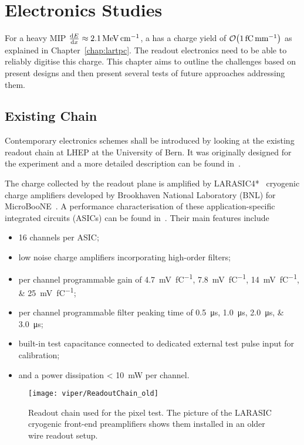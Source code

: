 \chapter{Electronics Studies}
\label{chap:electronics}

For a heavy MIP $\dv{E}{x} \approx \SI{2.1}{\mega\electronvolt\per\centi\metre}$, a \lartpc{} has a charge yield of $\order{\SI{1}{\femto\coulomb\per\milli\metre}}$ as explained in Chapter~\ref{chap:lartpc}.
The readout electronics need to be able to reliably digitise this charge.
This chapter aims to outline the challenges based on present designs and then present several tests of future approaches addressing them.

\section{Existing Chain}
\label{sec:electronics_existing}
Contemporary electronics schemes shall be introduced by looking at the existing readout chain at LHEP at the University of Bern.
It was originally designed for the \AT{} experiment and a more detailed description can be found in~\cite{AT_larasic}.

The charge collected by the readout plane is amplified by LARASIC4*~\cite{larasic} cryogenic charge amplifiers developed by Brookhaven National Laboratory (BNL) for MicroBooNE~\cite{uboone}.
A performance characterisation of these application-specific integrated circuits (ASICs) can be found in~\cite{AT_larasic}.
Their main features include

\begin{itemize}
	\item \num{16} channels per ASIC;
	\item low noise charge amplifiers incorporating high-order filters;
	\item per channel programmable gain of \SIlist[list-final-separator = { or }]{4.7; 7.8; 14; 25}{\milli\volt\per\femto\coulomb};
	\item per channel programmable filter peaking time of \SIlist[list-final-separator = { or }]{0.5; 1.0; 2.0; 3.0}{\micro\second};
	\item built-in test capacitance connected to dedicated external test pulse input for calibration;
	\item and a power dissipation \SI{< 10}{\milli\watt} per channel.
\end{itemize}

\begin{figure}[htb]
	\centering
	\texttt{[image: viper/ReadoutChain\_old]}
	\caption{Readout chain used for the pixel test. The picture of the LARASIC cryogenic front-end preamplifiers shows them installed in an older wire readout setup.~\cite{AT_larasic}}
	\label{fig:viper_readoutChain_old}
\end{figure}

